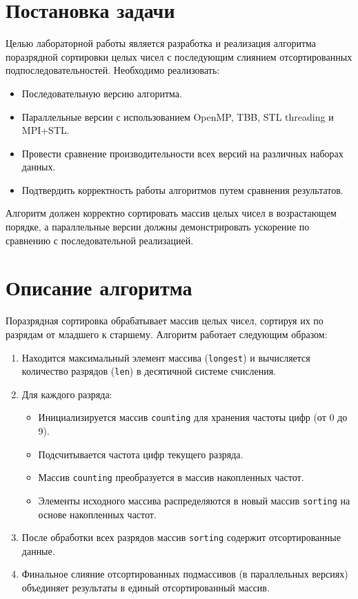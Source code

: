 \documentclass[a4paper,12pt]{article}
\begin{document}
\section{Постановка задачи}
Целью лабораторной работы является разработка и реализация алгоритма поразрядной сортировки целых чисел с последующим слиянием отсортированных подпоследовательностей. Необходимо реализовать:
\begin{itemize}
    \item Последовательную версию алгоритма.
    \item Параллельные версии с использованием OpenMP, TBB, STL threading и MPI+STL.
    \item Провести сравнение производительности всех версий на различных наборах данных.
    \item Подтвердить корректность работы алгоритмов путем сравнения результатов.
\end{itemize}
Алгоритм должен корректно сортировать массив целых чисел в возрастающем порядке, а параллельные версии должны демонстрировать ускорение по сравнению с последовательной реализацией.

\section{Описание алгоритма}
Поразрядная сортировка обрабатывает массив целых чисел, сортируя их по разрядам от младшего к старшему. Алгоритм работает следующим образом:
\begin{enumerate}
    \item Находится максимальный элемент массива (\texttt{longest}) и вычисляется количество разрядов (\texttt{len}) в десятичной системе счисления.
    \item Для каждого разряда:
        \begin{itemize}
            \item Инициализируется массив \texttt{counting} для хранения частоты цифр (от 0 до 9).
            \item Подсчитывается частота цифр текущего разряда.
            \item Массив \texttt{counting} преобразуется в массив накопленных частот.
            \item Элементы исходного массива распределяются в новый массив \texttt{sorting} на основе накопленных частот.
        \end{itemize}
    \item После обработки всех разрядов массив \texttt{sorting} содержит отсортированные данные.
    \item Финальное слияние отсортированных подмассивов (в параллельных версиях) объединяет результаты в единый отсортированный массив.
\end{enumerate}
\end{document}

